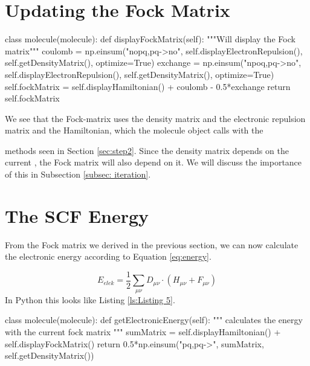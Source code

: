 \section{Updating the Fock Matrix}
\label{sec:step4}


    
\begin{python}[caption={calculating the Fock matrix},label={ls:Listing 4}]
    class molecule(molecule):
        def displayFockMatrix(self):
            """Will display the Fock matrix"""
            coulomb = np.einsum("nopq,pq->no", 
                    self.displayElectronRepulsion(), 
                    self.getDensityMatrix(), optimize=True)
            exchange = np.einsum("npoq,pq->no", 
                    self.displayElectronRepulsion(), 
                    self.getDensityMatrix(), optimize=True)
            self.fockMatrix = self.displayHamiltonian() 
                            + coulomb - 0.5*exchange
            return self.fockMatrix
\end{python}
 
 
We see that the Fock-matrix uses the density matrix and the electronic 
repulsion matrix and the Hamiltonian, which the molecule object calls with the 

methods seen in Section \ref{sec:step2}. Since the density matrix depends on the 
current , the Fock matrix will also depend on it. 
We will discuss the importance of this in Subsection \ref{subsec: iteration}. 

 
 \section{The SCF Energy}
 \label{sec:step5}
 From the Fock matrix we derived in the previous section, we can now calculate 
 the electronic energy according to Equation \eqref{eq:energy}.
 
 \begin{equation} \label{eq:energy}
     E_{elek} = \frac{1}{2}\sum_{\mu\nu}D_{\mu\nu}\cdot(H_{\mu\nu} + F_{\mu\nu})
 \end{equation}
 In Python this looks like Listing \ref{ls:Listing 5}.
 
 
    
\begin{python}[caption={calculating the energy},label={ls:Listing 5}]
    class molecule(molecule):
        def getElectronicEnergy(self):
            """
            calculates the energy with the current fock matrix
            """
            sumMatrix = self.displayHamiltonian() 
                    + self.displayFockMatrix()
            return 0.5*np.einsum("pq,pq->", sumMatrix, 
                            self.getDensityMatrix())
\end{python}

